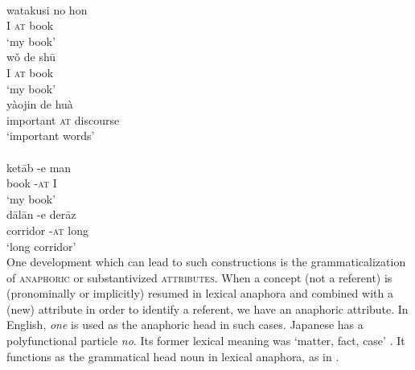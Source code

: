 \ea\label{ex:E37}
\langinfo{\LangJap}{}{}\\
\gll watakusi  no  hon  \\
 I  \textsc{at}  book\\
\glt   ‘my book’
\z
\noindent \ea\label{ex:E38}
\langinfo{\LangMand}{}{}  \\
 \ea
 \gll  w\v{o}  de  sh\=u  \\
 I  \textsc{at}  book  \\
\glt ‘my book’\\
\ex
\gll  yàojin  de  huà  \\
 important  \textsc{at}  discourse \\
 \glt ‘important words’\\
\z
\z
\noindent  \ea\label{ex:E39}
    \\
 \ea
 \gll  ket\=ab  {}-e  man  \\
book  {}-\textsc{at}  I \\
\glt ‘my book’\\
\ex
\gll  d\=al\=an  {}-e  der\=az  \\
 corridor  {}-\textsc{at}  long\\
 \glt 
 ‘long corridor’\\
\z
\z
\noindent One development which can lead to such constructions is the grammaticalization of \textsc{anaphoric} or substantivized \textsc{attributes}. When a concept (not a referent) is (pronominally or implicitly) resumed in lexical anaphora and combined with a (new) attribute in order to identify a referent, we have an anaphoric attribute. In English, \textit{one} is used as the anaphoric head in such cases.\label{page74} Japanese has a polyfunctional particle \textit{no}. Its former lexical meaning was ‘matter, fact, case’ \citep[99]{Jorden1962}. It functions as the grammatical head noun in lexical anaphora, as in . 

